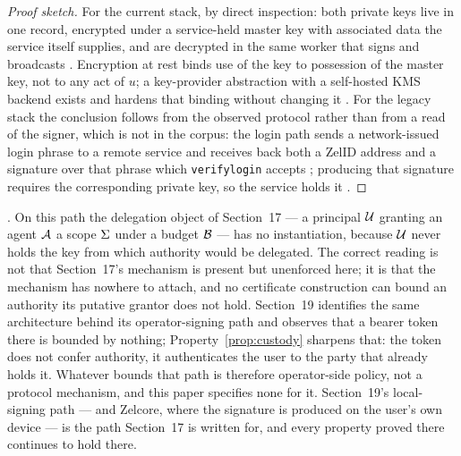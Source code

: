 \begin{proof}[Proof sketch]
For the current stack, by direct inspection: both private keys live in one record, encrypted under a
service-held master key with associated data the service itself supplies, and are decrypted in the
same worker that signs and broadcasts
. Encryption at rest binds use of the key
to possession of the master key, not to any act of $u$; a key-provider abstraction with a
self-hosted KMS backend exists and hardens that binding without changing it \inprogress
{}. For the legacy stack the conclusion follows
from the observed protocol rather than from a read of the signer, which is not in the corpus: the
login path sends a network-issued login phrase to a remote service and receives back both a ZelID
address and a signature over that phrase which \texttt{verifylogin} accepts
; producing that signature
requires the corresponding private key, so the service holds it \srcinferred.
\end{proof}

\begin{corollary}
\label{cor:nodelegation}
\shipped. On this path the delegation object of Section~17 --- a principal $\mathcal{U}$ granting an
agent $\mathcal{A}$ a scope $\Sigma$ under a budget $\mathcal{B}$ --- has no instantiation, because
$\mathcal{U}$ never holds the key from which authority would be delegated. The correct reading is not
that Section~17's mechanism is present but unenforced here; it is that the mechanism has nowhere to
attach, and no certificate construction can bound an authority its putative grantor does not hold.
Section~19 identifies the same architecture behind its operator-signing path and observes that a
bearer token there is bounded by nothing; Property~\ref{prop:custody} sharpens that: the token does
not confer authority, it authenticates the user to the party that already holds it. Whatever bounds
that path is therefore operator-side policy, not a protocol mechanism, and this paper specifies none
for it. Section~19's local-signing path --- \SSP and Zelcore, where the signature is produced on the
user's own device --- is the path Section~17 is written for, and every property proved there
continues to hold there.
\end{corollary}

